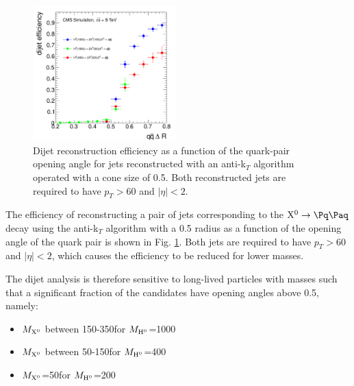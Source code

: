 \begin{figure}[htbp]
\centering
\includegraphics[width=0.49\textwidth]{plots/signal/effDijet.pdf}
\caption{Dijet reconstruction efficiency as a function of the quark-pair opening angle for jets reconstructed with an
anti-k$_T$ algorithm operated with a cone size of 0.5. Both reconstructed jets are required to have $p_T>60$\GeV
and $|\eta|<2$.  \label{fig:effdR}}
\end{figure}

The efficiency of reconstructing a pair of jets
 corresponding to the $\X \to \qq$ decay using the anti-k$_T$ algorithm with a 0.5 radius as a function of the
opening angle of the quark pair is shown in Fig. \ref{fig:effdR}. Both jets are required 
to have $p_T>60$\GeV and $|\eta|<2$, which causes the 
efficiency to be reduced for lower \Higgs  masses.
 

The dijet analysis is therefore sensitive to long-lived \X particles with masses
such that a significant fraction of the candidates have opening angles above 0.5, namely:
\begin{itemize}
\item $M_{\mathrm{X^{0}}}$ between 150-350\GeV for $M_{\mathrm{H}^{0}}$=1000\GeV
\item $M_{\mathrm{X^{0}}}$ between 50-150\GeV for $M_{\mathrm{H}^{0}}$=400\GeV
\item $M_{\mathrm{X^{0}}}$=50\GeV for $M_{\mathrm{H}^{0}}$=200\GeV
\end{itemize}


